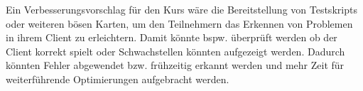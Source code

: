 \documentclass[12pt,a4paper,bibliography=totocnumbered,listof=totocnumbered]{article}
\begin{document}
Ein Verbesserungsvorschlag für den Kurs wäre die Bereitstellung von Testskripts oder weiteren \glqq bösen\grqq{} Karten, um den Teilnehmern das Erkennen von Problemen in ihrem Client zu erleichtern. Damit könnte bspw. überprüft werden ob der Client korrekt spielt oder Schwachstellen könnten aufgezeigt werden. Dadurch könnten Fehler abgewendet bzw. frühzeitig erkannt werden und mehr Zeit für weiterführende Optimierungen aufgebracht werden.

\newpage
\renewcommand\refname{Quellenverzeichnis}


\pagebreak
\end{document}
